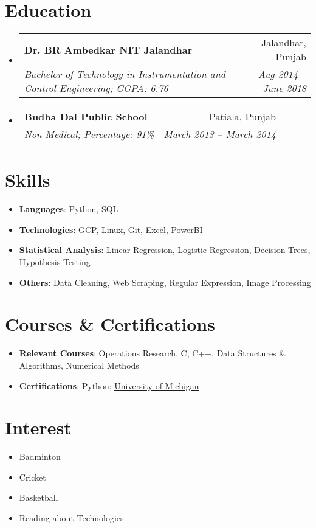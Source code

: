 \documentclass[letterpaper,11pt]{article}
\makeatletter
\newcommand{\resumeSubheading}[4]{
  \vspace{-1pt}\item
    \begin{tabular*}{0.97\textwidth}[t]{l@{\extracolsep{\fill}}r}
      \textbf{#1} & #2 \\
      \textit{\small#3} & \textit{\small #4} \\
    \end{tabular*}\vspace{-5pt}
}
\newcommand{\resumeSubHeadingListStart}{\begin{itemize}[leftmargin=*]}
\newcommand{\resumeSubHeadingListEnd}{\end{itemize}}
\makeatother
\begin{document}
\section{Education}
  \resumeSubHeadingListStart
    \resumeSubheading
      {Dr. BR Ambedkar NIT Jalandhar}{Jalandhar, Punjab}
      {Bachelor of Technology in Instrumentation and Control Engineering;  CGPA: 6.76}{Aug 2014 -- June 2018}
    \resumeSubheading
      {Budha Dal Public School}{Patiala, Punjab}
      {Non Medical; Percentage: 91\%}{March 2013 -- March 2014}
  \resumeSubHeadingListEnd

%
\section{Skills}
  \resumeSubHeadingListStart
    \item{
      \textbf{Languages}{: Python, SQL}
      \hfill
    }
    \item{
      \textbf{Technologies}{: GCP, Linux, Git, Excel, PowerBI}
      \hfill
    }
    \item{
      \textbf{Statistical Analysis}{: Linear Regression, Logistic Regression, Decision Trees, Hypothesis Testing}
      \hfill
    }
    \item{
      \textbf{Others}{: Data Cleaning, Web Scraping, Regular Expression, Image Processing}
      \hfill
    }
  \resumeSubHeadingListEnd
  
\section{Courses \& Certifications}
  \resumeSubHeadingListStart
    \item{
      \textbf{Relevant Courses}{: Operations Research, C, C++, Data Structures \& Algorithms, Numerical Methods}
      \hfill
    }
    \item{
      \textbf{Certifications}{: Python}; \underline{\href{https://www.coursera.org/account/accomplishments/certificate/BGRL6KFPRFAL}{University of Michigan}}
      \hfill
    }
  \resumeSubHeadingListEnd
  
\section{Interest}
  \resumeSubHeadingListStart
    \item{
      {Badminton}
      \hfill
    }
    \item{
      {Cricket}
      \hfill
    }
    \item{
      {Basketball}
      \hfill
    }
    \item{
      {Reading about Technologies}
      \hfill
    }
  \resumeSubHeadingListEnd


\end{document}
